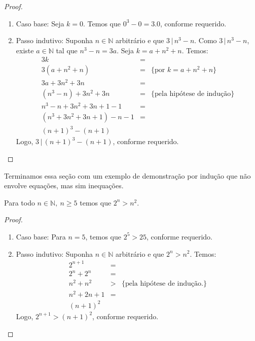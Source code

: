 \begin{proof}
\verb| |\\
\begin{enumerate}
  \item[\ ]Caso base: Seja $k = 0$. Temos que $0^3 - 0 = 3.0$, conforme requerido.
  \item[\ ]Passo indutivo: Suponha $n\in\mathbb{N}$ arbitrário e que
    $3\,|\,n^3 - n$. Como $3\,|\,n^3 - n$, existe $a\in\mathbb{N}$ tal
    que $n^3 - n = 3a$. Seja $k = a + n^2 + n$. Temos:
    \[
 \begin{array}{lcl}
   3k & = & \\
   3 (a + n^2 + n) & = & \{\text{por }k = a + n^2 + n\}\\
   3a + 3n^2 + 3n & = & \\
   (n^3 - n) + 3n^2 + 3n & = &\{\text{pela hipótese de indução}\}\\
   n^3 -n + 3n^2 + 3n + 1 - 1 & = & \\
   (n^3 + 3n^2 + 3n + 1) - n -1 & = & \\
   (n + 1)^3 - (n +1)
 \end{array}
    \]
    Logo, $3\,|\,(n+1)^3-(n+1)$, conforme requerido.
\end{enumerate}
\end{proof}
Terminamos essa seção com um exemplo de demonstração por indução que
não envolve equações, mas sim inequações.
\begin{Theorem}
Para todo $n\in\mathbb{N},\:n\geq 5$ temos que $2^n > n^2$.
\end{Theorem}
\begin{proof}
\verb| |\\
\begin{enumerate}
  \item[\ ]Caso base: Para $n = 5$, temos que $2^5 > 25$, conforme
    requerido.
  \item[\ ]Passo indutivo: Suponha $n\in\mathbb{N}$ arbitrário e que
    $2^n > n^2$. Temos:
   \[
\begin{array}{lcl}
    2^{n+1} & = &\\
    2^n + 2^n & = &\\
   n^2 + n^2  & > &\{\text{pela hipótese de indução.}\}\\
   n^2 + 2n + 1 & = &\\
   (n+ 1)^2
\end{array}
  \]
  Logo, $2^{n+1} > (n + 1)^2$, conforme requerido.
\end{enumerate}
\end{proof}
